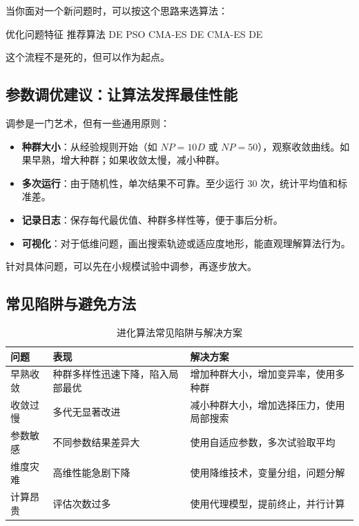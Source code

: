 \documentclass[lang=cn,zihao=-4,a4paper,fontset=windows]{beautybook}
\begin{document}
当你面对一个新问题时，可以按这个思路来选算法：

\begin{algorithm}[H]
\caption{进化算法选择流程}
\begin{algorithmic}[1]
\REQUIRE 优化问题特征
\ENSURE 推荐算法
    \RETURN DE 
    \RETURN PSO 
    \RETURN CMA-ES 
    \RETURN DE 
    \RETURN CMA-ES 
\ELSE
    \RETURN DE 
\ENDIF
\end{algorithmic}
\end{algorithm}

这个流程不是死的，但可以作为起点。

\subsection{参数调优建议：让算法发挥最佳性能}

调参是一门艺术，但有一些通用原则：

\begin{itemize}
    \item \textbf{种群大小}：从经验规则开始（如 $NP=10D$ 或 $NP=50$），观察收敛曲线。如果早熟，增大种群；如果收敛太慢，减小种群。
    \item \textbf{多次运行}：由于随机性，单次结果不可靠。至少运行 30 次，统计平均值和标准差。
    \item \textbf{记录日志}：保存每代最优值、种群多样性等，便于事后分析。
    \item \textbf{可视化}：对于低维问题，画出搜索轨迹或适应度地形，能直观理解算法行为。
\end{itemize}

针对具体问题，可以先在小规模试验中调参，再逐步放大。

\subsection{常见陷阱与避免方法}

\begin{table}[H]
\centering
\caption{进化算法常见陷阱与解决方案}
\begin{tabular}{p{}p{}p{}}
\toprule
\textbf{问题} & \textbf{表现} & \textbf{解决方案} \\
\midrule
早熟收敛 & 种群多样性迅速下降，陷入局部最优 & 增加种群大小，增加变异率，使用多种群 \\
\hline
收敛过慢 & 多代无显著改进 & 减小种群大小，增加选择压力，使用局部搜索 \\
\hline
参数敏感 & 不同参数结果差异大 & 使用自适应参数，多次试验取平均 \\
\hline
维度灾难 & 高维性能急剧下降 & 使用降维技术，变量分组，问题分解 \\
\hline
计算昂贵 & 评估次数过多 & 使用代理模型，提前终止，并行计算 \\
\bottomrule
\end{tabular}
\end{table}
\end{document}
